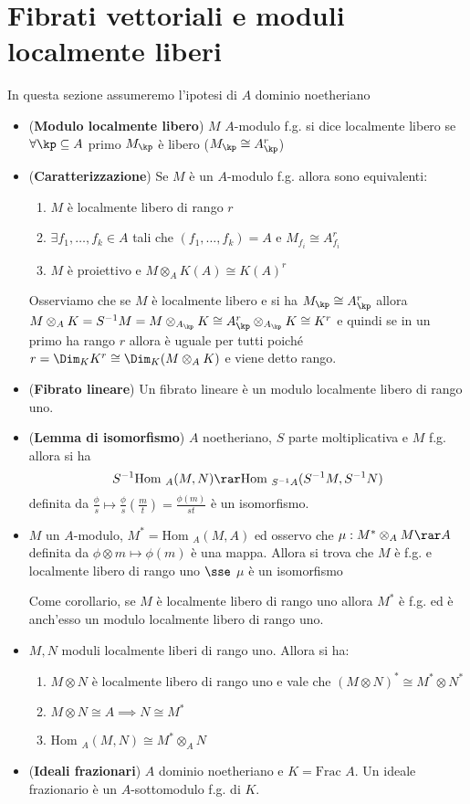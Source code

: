 \documentclass[a4paper,NoNotes,GeneralMath]{stdmdoc}
\newcommand{\Hom}{\text{Hom }}
\newcommand{\Frac}{\text{Frac }}
\begin{document}
\section*{Fibrati vettoriali e moduli localmente liberi}
In questa sezione assumeremo l'ipotesi di $A$ dominio noetheriano

\begin{itemize}
\item ({\bf Modulo localmente libero}) $M$ $A$-modulo f.g. si dice
  localmente libero se $\forall \kp \subseteq A$ primo $M_\kp$ è libero
  ($M_\kp \cong A_\kp^r$)
\item ({\bf Caratterizzazione}) Se $M$ è un $A$-modulo f.g. allora sono
  equivalenti:
  \begin{enumerate}
  \item $M$ è localmente libero di rango $r$
  \item $\exists f_1, \ldots, f_k \in A$ tali che $(f_1, \ldots, f_k) =
    A$ e $M_{f_i} \cong A_{f_i}^r$
  \item $M$ è proiettivo e $M \otimes_A K(A) \cong K(A)^r$
  \end{enumerate}

  Osserviamo che se $M$ è localmente libero e si ha
  $M_\kp \cong A_\kp^r$ allora
  $M \otimes_A K = S^{-1}M = M \otimes_{A_\kp} K \cong A_\kp^r
  \otimes_{A_\kp} K \cong K^r$ e quindi se in un primo ha rango $r$
  allora è uguale per tutti poiché
  $r = \Dim_K K^r \cong \Dim_K (M \otimes_A K)$ e viene detto rango.
\item ({\bf Fibrato lineare}) Un fibrato lineare è un modulo localmente
  libero di rango uno.
\item ({\bf Lemma di isomorfismo}) $A$ noetheriano, $S$ parte
  moltiplicativa e $M$ f.g. allora si ha
  $$ S^{-1} \Hom_A (M, N) \rar \Hom_{S^{-1}A} (S^{-1}M, S^{-1}N) $$
  definita da
  $\frac{\phi}{s} \mapsto \frac{\phi}{s} (\frac{m}{t}) =
  \frac{\phi(m)}{st}$ è un isomorfismo.
\item $M$ un $A$-modulo, $M^* = \Hom_A (M, A)$ ed osservo che
  $\mu: M^* \otimes_A M \rar A$ definita da $\phi \otimes m \mapsto
  \phi(m)$ è una mappa. Allora si trova che $M$ è f.g. e localmente
  libero di rango uno $\sse$ $\mu$ è un isomorfismo

  Come corollario, se $M$ è localmente libero di rango uno allora $M^*$
  è f.g. ed è anch'esso un modulo localmente libero di rango uno.
\item $M, N$ moduli localmente liberi di rango uno. Allora si ha:
  \begin{enumerate}
  \item $M \otimes N$ è localmente libero di rango uno e vale che
    $(M \otimes N)^* \cong M^* \otimes N^*$
  \item $M \otimes N \cong A \implies N \cong M^*$
  \item $\Hom_A (M, N) \cong M^* \otimes_A N$
  \end{enumerate}
\item ({\bf Ideali frazionari}) $A$ dominio noetheriano e $K = \Frac
  A$. Un ideale frazionario è un $A$-sottomodulo f.g. di $K$.


\end{itemize}
\end{document}
